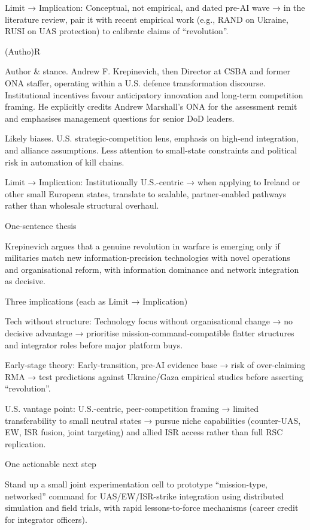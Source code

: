 Limit → Implication: Conceptual, not empirical, and dated pre-AI wave → in the literature review, pair it with recent empirical work (e.g., RAND on Ukraine, RUSI on UAS protection) to calibrate claims of “revolution”.

(Autho)R

Author & stance. Andrew F. Krepinevich, then Director at CSBA and former ONA staffer, operating within a U.S. defence transformation discourse. Institutional incentives favour anticipatory innovation and long-term competition framing. He explicitly credits Andrew Marshall’s ONA for the assessment remit and emphasises management questions for senior DoD leaders.

Likely biases. U.S. strategic-competition lens, emphasis on high-end integration, and alliance assumptions. Less attention to small-state constraints and political risk in automation of kill chains.

Limit → Implication: Institutionally U.S.-centric → when applying to Ireland or other small European states, translate to scalable, partner-enabled pathways rather than wholesale structural overhaul.

One-sentence thesis

Krepinevich argues that a genuine revolution in warfare is emerging only if militaries match new information-precision technologies with novel operations and organisational reform, with information dominance and network integration as decisive.

Three implications (each as Limit → Implication)

Tech without structure: Technology focus without organisational change → no decisive advantage → prioritise mission-command-compatible flatter structures and integrator roles before major platform buys.

Early-stage theory: Early-transition, pre-AI evidence base → risk of over-claiming RMA → test predictions against Ukraine/Gaza empirical studies before asserting “revolution”.

U.S. vantage point: U.S.-centric, peer-competition framing → limited transferability to small neutral states → pursue niche capabilities (counter-UAS, EW, ISR fusion, joint targeting) and allied ISR access rather than full RSC replication.

One actionable next step

Stand up a small joint experimentation cell to prototype “mission-type, networked” command for UAS/EW/ISR-strike integration using distributed simulation and field trials, with rapid lessons-to-force mechanisms (career credit for integrator officers).



